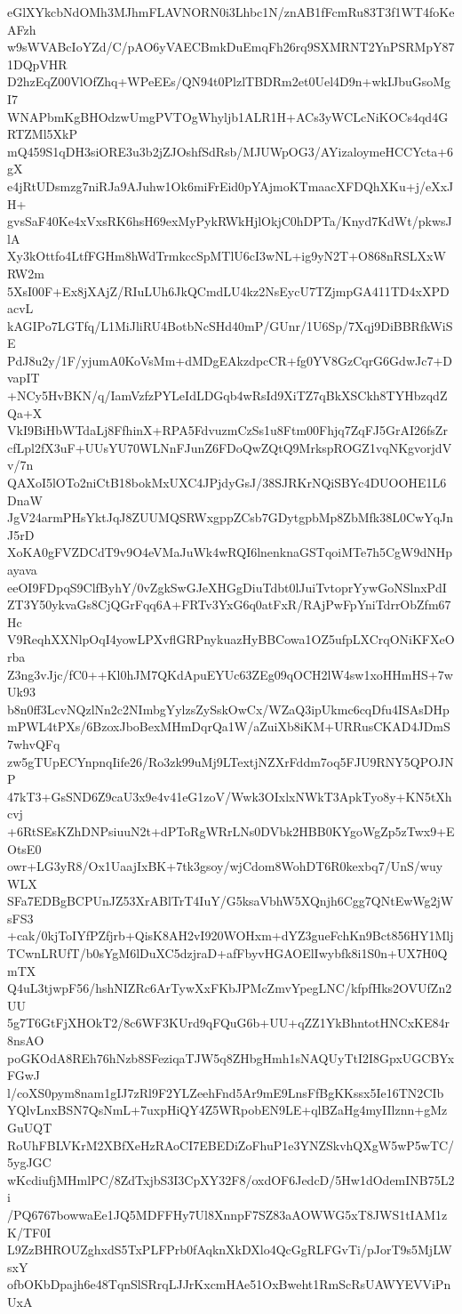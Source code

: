 eGlXYkcbNdOMh3MJhmFLAVNORN0i3Lhbc1N/znAB1fFcmRu83T3f1WT4foKeAFzh
w9sWVABcIoYZd/C/pAO6yVAECBmkDuEmqFh26rq9SXMRNT2YnPSRMpY871DQpVHR
D2hzEqZ00VlOfZhq+WPeEEs/QN94t0PlzlTBDRm2et0Uel4D9n+wkIJbuGsoMgI7
WNAPbmKgBHOdzwUmgPVTOgWhyljb1ALR1H+ACs3yWCLcNiKOCs4qd4GRTZMl5XkP
mQ459S1qDH3siORE3u3b2jZJOshfSdRsb/MJUWpOG3/AYizaloymeHCCYcta+6gX
e4jRtUDsmzg7niRJa9AJuhw1Ok6miFrEid0pYAjmoKTmaacXFDQhXKu+j/eXxJH+
gvsSaF40Ke4xVxsRK6hsH69exMyPykRWkHjlOkjC0hDPTa/Knyd7KdWt/pkwsJlA
Xy3kOttfo4LtfFGHm8hWdTrmkccSpMTlU6cI3wNL+ig9yN2T+O868nRSLXxWRW2m
5XsI00F+Ex8jXAjZ/RIuLUh6JkQCmdLU4kz2NsEycU7TZjmpGA411TD4xXPDacvL
kAGIPo7LGTfq/L1MiJliRU4BotbNcSHd40mP/GUnr/1U6Sp/7Xqj9DiBBRfkWiSE
PdJ8u2y/1F/yjumA0KoVsMm+dMDgEAkzdpcCR+fg0YV8GzCqrG6GdwJc7+DvapIT
+NCy5HvBKN/q/IamVzfzPYLeIdLDGqb4wRsId9XiTZ7qBkXSCkh8TYHbzqdZQa+X
VkI9BiHbWTdaLj8FfhinX+RPA5FdvuzmCzSs1u8Ftm00Fhjq7ZqFJ5GrAI26fsZr
cfLpl2fX3uF+UUsYU70WLNnFJunZ6FDoQwZQtQ9MrkspROGZ1vqNKgvorjdVv/7n
QAXoI5lOTo2niCtB18bokMxUXC4JPjdyGsJ/38SJRKrNQiSBYc4DUOOHE1L6DnaW
JgV24armPHsYktJqJ8ZUUMQSRWxgppZCsb7GDytgpbMp8ZbMfk38L0CwYqJnJ5rD
XoKA0gFVZDCdT9v9O4eVMaJuWk4wRQI6lnenknaGSTqoiMTe7h5CgW9dNHpayava
eeOI9FDpqS9ClfByhY/0vZgkSwGJeXHGgDiuTdbt0lJuiTvtoprYywGoNSlnxPdI
ZT3Y50ykvaGs8CjQGrFqq6A+FRTv3YxG6q0atFxR/RAjPwFpYniTdrrObZfm67Hc
V9ReqhXXNlpOqI4yowLPXvflGRPnykuazHyBBCowa1OZ5ufpLXCrqONiKFXeOrba
Z3ng3vJjc/fC0++Kl0hJM7QKdApuEYUc63ZEg09qOCH2lW4sw1xoHHmHS+7wUk93
b8n0ff3LcvNQzlNn2c2NImbgYylzsZySskOwCx/WZaQ3ipUkmc6cqDfu4ISAsDHp
mPWL4tPXs/6BzoxJboBexMHmDqrQa1W/aZuiXb8iKM+URRusCKAD4JDmS7whvQFq
zw5gTUpECYnpnqIife26/Ro3zk99uMj9LTextjNZXrFddm7oq5FJU9RNY5QPOJNP
47kT3+GsSND6Z9caU3x9e4v41eG1zoV/Wwk3OIxlxNWkT3ApkTyo8y+KN5tXhcvj
+6RtSEsKZhDNPsiuuN2t+dPToRgWRrLNs0DVbk2HBB0KYgoWgZp5zTwx9+EOtsE0
owr+LG3yR8/Ox1UaajIxBK+7tk3gsoy/wjCdom8WohDT6R0kexbq7/UnS/wuyWLX
SFa7EDBgBCPUnJZ53XrABlTrT4IuY/G5ksaVbhW5XQnjh6Cgg7QNtEwWg2jWsFS3
+cak/0kjToIYfPZfjrb+QisK8AH2vI920WOHxm+dYZ3gueFchKn9Bct856HY1Mlj
TCwnLRUfT/b0sYgM6lDuXC5dzjraD+afFbyvHGAOElIwybfk8i1S0n+UX7H0QmTX
Q4uL3tjwpF56/hshNIZRc6ArTywXxFKbJPMcZmvYpegLNC/kfpfHks2OVUfZn2UU
5g7T6GtFjXHOkT2/8c6WF3KUrd9qFQuG6b+UU+qZZ1YkBhntotHNCxKE84r8nsAO
poGKOdA8REh76hNzb8SFeziqaTJW5q8ZHbgHmh1sNAQUyTtI2I8GpxUGCBYxFGwJ
l/coXS0pym8nam1gIJ7zRl9F2YLZeehFnd5Ar9mE9LnsFfBgKKssx5Ie16TN2CIb
YQlvLnxBSN7QsNmL+7uxpHiQY4Z5WRpobEN9LE+qlBZaHg4myIIlznn+gMzGuUQT
RoUhFBLVKrM2XBfXeHzRAoCI7EBEDiZoFhuP1e3YNZSkvhQXgW5wP5wTC/5ygJGC
wKcdiufjMHmlPC/8ZdTxjbS3I3CpXY32F8/oxdOF6JedcD/5Hw1dOdemINB75L2i
/PQ6767bowwaEe1JQ5MDFFHy7Ul8XnnpF7SZ83aAOWWG5xT8JWS1tIAM1zK/TF0I
L9ZzBHROUZghxdS5TxPLFPrb0fAqknXkDXlo4QcGgRLFGvTi/pJorT9s5MjLWsxY
ofbOKbDpajh6e48TqnSlSRrqLJJrKxcmHAe51OxBweht1RmScRsUAWYEVViPnUxA

